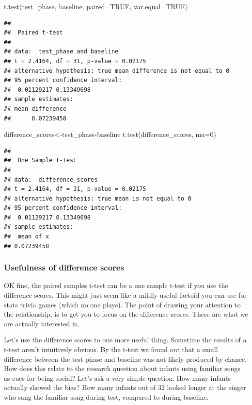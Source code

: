 \documentclass[
]{book}
\newenvironment{Shaded}{\begin{snugshade}}{\end{snugshade}}
\newcommand{\AttributeTok}[1]{\textcolor[rgb]{0.77,0.63,0.00}{#1}}
\newcommand{\ConstantTok}[1]{\textcolor[rgb]{0.00,0.00,0.00}{#1}}
\newcommand{\DecValTok}[1]{\textcolor[rgb]{0.00,0.00,0.81}{#1}}
\newcommand{\FunctionTok}[1]{\textcolor[rgb]{0.00,0.00,0.00}{#1}}
\newcommand{\NormalTok}[1]{#1}
\newcommand{\OtherTok}[1]{\textcolor[rgb]{0.56,0.35,0.01}{#1}}
\newcommand{\SpecialCharTok}[1]{\textcolor[rgb]{0.00,0.00,0.00}{#1}}
\begin{document}
\begin{Shaded}
\begin{Highlighting}[]
\FunctionTok{t.test}\NormalTok{(test\_phase, baseline, }\AttributeTok{paired=}\ConstantTok{TRUE}\NormalTok{, }\AttributeTok{var.equal=}\ConstantTok{TRUE}\NormalTok{)}
\end{Highlighting}
\end{Shaded}

\begin{verbatim}
## 
##  Paired t-test
## 
## data:  test_phase and baseline
## t = 2.4164, df = 31, p-value = 0.02175
## alternative hypothesis: true mean difference is not equal to 0
## 95 percent confidence interval:
##  0.01129217 0.13349698
## sample estimates:
## mean difference 
##      0.07239458
\end{verbatim}

\begin{Shaded}
\begin{Highlighting}[]
\NormalTok{difference\_scores}\OtherTok{\textless{}{-}}\NormalTok{test\_phase}\SpecialCharTok{{-}}\NormalTok{baseline}
\FunctionTok{t.test}\NormalTok{(difference\_scores, }\AttributeTok{mu=}\DecValTok{0}\NormalTok{)}
\end{Highlighting}
\end{Shaded}

\begin{verbatim}
## 
##  One Sample t-test
## 
## data:  difference_scores
## t = 2.4164, df = 31, p-value = 0.02175
## alternative hypothesis: true mean is not equal to 0
## 95 percent confidence interval:
##  0.01129217 0.13349698
## sample estimates:
##  mean of x 
## 0.07239458
\end{verbatim}

\hypertarget{usefulness-of-difference-scores}{%
\subsubsection{Usefulness of difference scores}\label{usefulness-of-difference-scores}}

OK fine, the paired samples t-test can be a one sample t-test if you use the difference scores. This might just seem like a mildly useful factoid you can use for stats trivia games (which no one plays). The point of drawing your attention to the relationship, is to get you to focus on the difference scores. These are what we are actually interested in.

Let's use the difference scores to one more useful thing. Sometime the results of a t-test aren't intuitively obvious. By the t-test we found out that a small difference between the test phase and baseline was not likely produced by chance. How does this relate to the research question about infants using familiar songs as cues for being social? Let's ask a very simple question. How many infants actually showed the bias? How many infants out of 32 looked longer at the singer who sang the familiar song during test, compared to during baseline.
\end{document}
